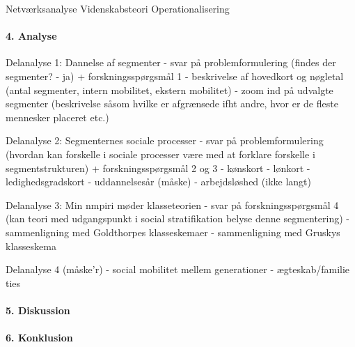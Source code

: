 	Netværksanalyse
	Videnskabsteori
	Operationalisering


\paragraph{4. Analyse}

	Delanalyse 1: Dannelse af segmenter
		- svar på problemformulering (findes der segmenter? - ja) + forskningsspørgsmål 1
		- beskrivelse af hovedkort og nøgletal (antal segmenter, intern mobilitet, ekstern mobilitet)
		- zoom ind på udvalgte segmenter (beskrivelse såsom hvilke er afgrænsede ifht andre, hvor er de fleste mennesker placeret etc.) 

	Delanalyse 2: Segmenternes sociale processer
		- svar på problemformulering (hvordan kan forskelle i sociale processer være med at forklare forskelle i segmentstrukturen) + forskningsspørgsmål 2 og 3
		- kønskort
		- lønkort
		- ledighedsgradskort
		- uddannelsesår (måske)
		- arbejdsløshed (ikke langt)

	Delanalyse 3: Min nmpiri møder klasseteorien
		- svar på forskningsspørgsmål 4 (kan teori med udgangspunkt i social stratifikation belyse denne segmentering)
		- sammenligning med Goldthorpes klasseskemaer
		- sammenligning med Gruskys klasseskema

	Delanalyse 4 (måske'r)
		- social mobilitet mellem generationer
		- ægteskab/familie ties


\paragraph{5. Diskussion}




\paragraph{6. Konklusion}
















